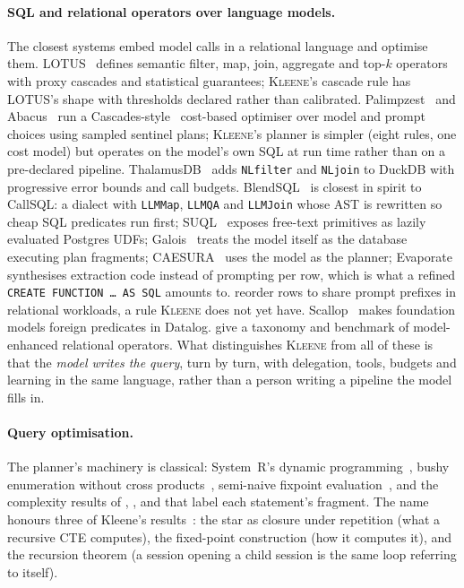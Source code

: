 \documentclass[11pt,a4paper]{article}
\newcommand{\kleene}{\textsc{Kleene}}
\newcommand{\callsql}{CallSQL}
\newcommand{\code}[1]{\texttt{#1}}
\begin{document}
\paragraph{SQL and relational operators over language models.} The closest
systems embed model calls in a relational language and optimise them.
LOTUS~\citep{patel2025semantic} defines semantic filter, map, join, aggregate
and top-$k$ operators with proxy cascades and statistical guarantees;
\kleene's cascade rule has LOTUS's shape with thresholds declared rather than
calibrated. Palimpzest~\citep{liu2025palimpzest} and
Abacus~\citep{russo2025abacus} run a Cascades-style~\citep{graefe1995cascades}
cost-based optimiser over model and prompt choices using sampled sentinel
plans; \kleene's planner is simpler (eight rules, one cost model) but
operates on the model's own SQL at run time rather than on a pre-declared
pipeline. ThalamusDB~\citep{jo2024thalamusdb} adds \code{NLfilter} and
\code{NLjoin} to DuckDB with progressive error bounds and call budgets.
BlendSQL~\citep{glenn2024blendsql} is closest in spirit to \callsql: a dialect
with \code{LLMMap}, \code{LLMQA} and \code{LLMJoin} whose AST is rewritten so
cheap SQL predicates run first; SUQL~\citep{liu2024suql} exposes free-text
primitives as lazily evaluated Postgres UDFs; Galois~\citep{saeed2023galois}
treats the model itself as the database executing plan fragments;
CAESURA~\citep{urban2023caesura} uses the model as the planner;
Evaporate~\citep{arora2023evaporate} synthesises extraction code instead of
prompting per row, which is what a refined \code{CREATE FUNCTION \ldots{} AS
SQL} amounts to. \citet{liu2024optimizing} reorder rows to share prompt
prefixes in relational workloads, a rule \kleene{} does not yet have.
Scallop~\citep{li2023scallop} makes foundation models foreign predicates in
Datalog. \citet{su2026lro} give a taxonomy and benchmark of model-enhanced
relational operators. What distinguishes \kleene{} from all of these is that the
\emph{model writes the query}, turn by turn, with delegation, tools, budgets and
learning in the same language, rather than a person writing a pipeline the
model fills in.

\paragraph{Query optimisation.} The planner's machinery is classical:
System~R's dynamic programming~\citep{selinger1979access}, bushy enumeration
without cross products~\citep{moerkotte2006analysis}, semi-naive fixpoint
evaluation~\citep{bancilhon1986amateur}, and the complexity results of
\citet{chandra1977conjunctive}, \citet{vardi1982complexity},
\citet{aho1979universality} and \citet{dantsin2001complexity} that label each
statement's fragment. The name honours three of Kleene's
results~\citep{kleene1956representation,kleene1952metamathematics,kleene1938notation}:
the star as closure under repetition (what a recursive CTE computes), the
fixed-point construction (how it computes it), and the recursion theorem (a
session opening a child session is the same loop referring to itself).
\end{document}
